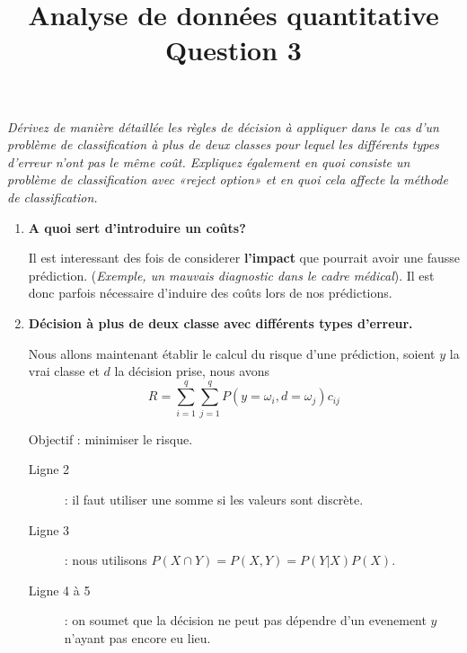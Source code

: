 \documentclass[a4paper, 11pt, onecolumn]{article}
\title{Analyse de données quantitative\\Question 3}
\date{}
\begin{document}
\maketitle

\textit{Dérivez de manière détaillée les règles de décision à appliquer dans le cas d’un problème de classification à plus de deux classes pour lequel les différents types d’erreur n’ont pas le même coût. Expliquez également en quoi consiste un problème de classification avec «reject option» et en quoi cela affecte la méthode de classification.}

\begin{enumerate}
\item \textbf{A quoi sert d'introduire un coûts?}

  Il est interessant des fois de considerer \textbf{l'impact} que pourrait avoir une fausse prédiction. (\textit{Exemple, un mauvais diagnostic dans le cadre médical}).
  Il est donc parfois nécessaire d'induire des coûts lors de nos prédictions.

\item \textbf{Décision à plus de deux classe avec différents types d'erreur.}


Nous allons maintenant établir le calcul du risque d'une prédiction, soient $y$ la vrai classe et $d$ la décision prise, nous avons
$$R = \sum_{i=1}^q\sum_{j=1}^qP(y=\omega_i, d=\omega_j)c_{ij}$$

Objectif : minimiser le risque.

\begin{framed}
  \begin{description}
  \item [Ligne 2] : il faut utiliser une somme si les valeurs sont discrète. 
\item [Ligne 3] : nous utilisons $P(X \cap Y) = P(X,Y) = P(Y|X)P(X)$.
    \item [Ligne 4 à 5] : on soumet que la décision ne peut pas dépendre d'un evenement $y$ n'ayant pas encore eu lieu.
  \end{description}


\end{framed}
\end{enumerate}
\end{document}
